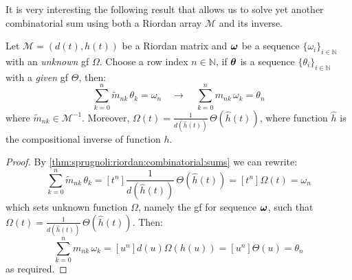 It is very interesting the following result that allows us to solve
yet another combinatorial sum using both a Riordan array $\mathcal{M}$
and its inverse.

\begin{theorem}
    Let $\mathcal{M}=(d(t),h(t))$ be a Riordan matrix and $\boldsymbol{\omega}$ 
    be a sequence $\lbrace\omega_{i}\rbrace_{i\in\mathbb{N}}$ with an \emph{unknown} 
    \ac{gf} $\Omega$. Choose a row index $n\in\mathbb{N}$, if $\boldsymbol{\theta}$ is a  
    sequence $\lbrace\theta_{i}\rbrace_{i\in\mathbb{N}}$ with a \emph{given} \ac{gf} $\Theta$, 
    then:
    \begin{displaymath}
        \sum_{k=0}^{n}{\tilde{m}_{nk}\,\theta_{k}}=\omega_{n}
        \quad\rightarrow\quad 
        \sum_{k=0}^{n}{m_{nk}\,\omega_{k}}=\theta_{n}
    \end{displaymath}
    where $\tilde{m}_{nk}\in\mathcal{M}^{-1}$. Moreover, 
    $\Omega(t)=\frac{1}{d(\hat{h}(t))}\,\Theta(\hat{h}(t))$,
    where function $\hat{h}$ is the compositional inverse of 
    function $h$.
    \label{thm:sprugnoli:sequences:inversion:by:combinatorial:sums}
\end{theorem}

\begin{proof}
    By \autoref{thm:sprugnoli:riordan:combinatorial:sums} we can rewrite:
    \begin{displaymath}
        \sum_{k=0}^{n}{\tilde{m}_{nk}\,\theta_{k}}
            = [t^{n}]\frac{1}{d(\hat{h}(t))}\,\Theta(\hat{h}(t)) 
            = [t^{n}]\Omega(t) = \omega_{n}
    \end{displaymath}
    which sets unknown function $\Omega$, namely the \ac{gf} for 
    sequence $\boldsymbol{\omega}$, such that $\Omega(t)=\frac{1}{d(\hat{h}(t))}\,\Theta(\hat{h}(t))$. 
    Then:
    \begin{displaymath}
        \sum_{k=0}^{n}{m_{nk}\,\omega_{k}}
            = [u^{n}]d(u)\Omega(h(u))
            = [u^{n}]\Theta(u)
            = \theta_{n}
    \end{displaymath}
    as required.
\end{proof}

